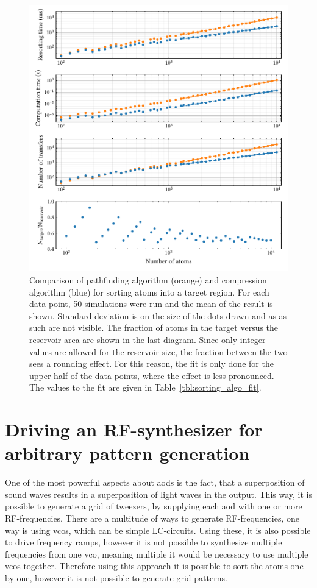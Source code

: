 \begin{figure}[h]%
\centering
\includegraphics{figures/sorting_algos_155.pdf}
\caption{Comparison of pathfinding algorithm (orange) and compression algorithm (blue) for sorting atoms into a target region. For each data point, 50 simulations were run and the mean of the result is shown. Standard deviation is on the size of the dots drawn and as as such are not visible. The fraction of atoms in the target versus the reservoir area are shown in the last diagram. Since only integer values are allowed for the reservoir size, the fraction between the two sees a rounding effect. For this reason, the fit is only done for the upper half of the data points, where the effect is less pronounced. The values to the fit are given in Table~\ref{tbl:sorting_algo_fit}.}%
\label{fig:sorting_algos}
\end{figure}

\section{Driving an RF-synthesizer for arbitrary pattern generation}

One of the most powerful aspects about \acp{aod} is the fact, that a superposition of sound waves results in a superposition of light waves in the output. This way, it is possible to generate a grid of tweezers, by supplying each \ac{aod} with one or more RF-frequencies. There are a multitude of ways to generate RF-frequencies, one way is using \acp{vco}, which can be simple LC-circuits. Using these, it is also possible to drive frequency ramps, however it is not possible to synthesize multiple frequencies from one \ac{vco}, meaning multiple it would be necessary to use multiple \acp{vco} together. Therefore using this approach it is possible to sort the atoms one-by-one, however it is not possible to generate grid patterns.

